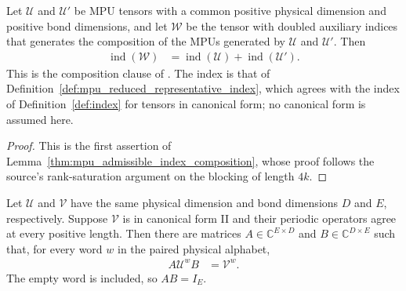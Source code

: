 \begin{lemma}
    \label{lem:mpu_index_composition}
    \leanok
    Let $\mathcal U$ and $\mathcal U'$ be MPU tensors with a common positive
    physical dimension and positive bond dimensions, and let $\mathcal W$ be
    the tensor with doubled auxiliary indices that generates the composition
    of the MPUs generated by $\mathcal U$ and $\mathcal U'$. Then
    \begin{align}
        \operatorname{ind}(\mathcal W)
         & =\operatorname{ind}(\mathcal U)+\operatorname{ind}(\mathcal U').
    \end{align}
    This is the composition clause of \cite[Theorem~IV.6(ii)]{Cirac2017MPU}.
    The index is that of
    Definition~\ref{def:mpu_reduced_representative_index}, which agrees with
    the index of Definition~\ref{def:index} for tensors in canonical form; no
    canonical form is assumed here.
\end{lemma}

\begin{proof}\leanok
    This is the first assertion of
    Lemma~\ref{thm:mpu_admissible_index_composition}, whose proof follows the
    source's rank-saturation argument on the blocking of length $4k$.
\end{proof}

\begin{lemma}
    \label{thm:mpu_canonical_representative_reduction}
    \leanok
    Let $\mathcal U$ and $\mathcal V$ have the same physical dimension and
    bond dimensions $D$ and $E$, respectively. Suppose $\mathcal V$ is in
    canonical form II and their periodic operators agree at every positive
    length. Then there are matrices $A\in\mathbb C^{E\times D}$ and
    $B\in\mathbb C^{D\times E}$ such that, for every word $w$ in the paired
    physical alphabet,
    \begin{align}
        A\mathcal U^w B & =\mathcal V^w.
    \end{align}
    The empty word is included, so $AB=I_E$.
\end{lemma}

